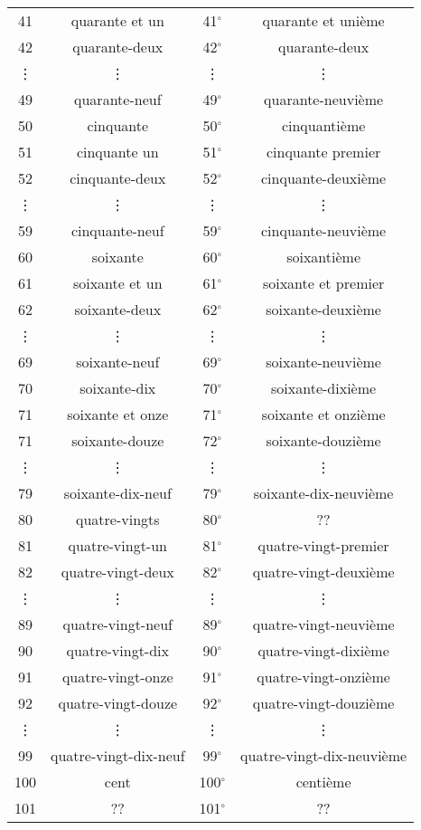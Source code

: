 \begin{tabular}{cccc}
	41&quarante et un&41$^\circ$&quarante et unième\\
	42&quarante-deux&42$^\circ$&quarante-deux\\
	\vdots&\vdots&\vdots&\vdots\\
	49&quarante-neuf&49$^\circ$&quarante-neuvième\\
	50&cinquante&50$^\circ$&cinquantième\\
	51&cinquante un&51$^\circ$&cinquante premier\\
	52&cinquante-deux&52$^\circ$&cinquante-deuxième\\
	\vdots&\vdots&\vdots&\vdots\\
	59&cinquante-neuf&59$^\circ$&cinquante-neuvième\\
	60&soixante&60$^\circ$&soixantième\\
	61&soixante et un&61$^\circ$&soixante et premier\\
	62&soixante-deux&62$^\circ$&soixante-deuxième\\
	\vdots&\vdots&\vdots&\vdots\\
	69&soixante-neuf&69$^\circ$&soixante-neuvième\\
	70&soixante-dix&70$^\circ$&soixante-dixième\\
	71&soixante et onze&71$^\circ$&soixante et onzième\\
	71&soixante-douze&72$^\circ$&soixante-douzième\\
	\vdots&\vdots&\vdots&\vdots\\
	79&soixante-dix-neuf&79$^\circ$&soixante-dix-neuvième\\
	80&quatre-vingts&80$^\circ$&??\\
	81&quatre-vingt-un&81$^\circ$&quatre-vingt-premier\\
	82&quatre-vingt-deux&82$^\circ$&quatre-vingt-deuxième\\
	\vdots&\vdots&\vdots&\vdots\\
	89&quatre-vingt-neuf&89$^\circ$&quatre-vingt-neuvième\\
	90&quatre-vingt-dix&90$^\circ$&quatre-vingt-dixième\\
	91&quatre-vingt-onze&91$^\circ$&quatre-vingt-onzième\\
	92&quatre-vingt-douze&92$^\circ$&quatre-vingt-douzième\\
	\vdots&\vdots&\vdots&\vdots\\
	99&quatre-vingt-dix-neuf&99$^\circ$&quatre-vingt-dix-neuvième\\
	100&cent&100$^\circ$&centième\\
	101&??&101$^\circ$&??\\

\end{tabular}
